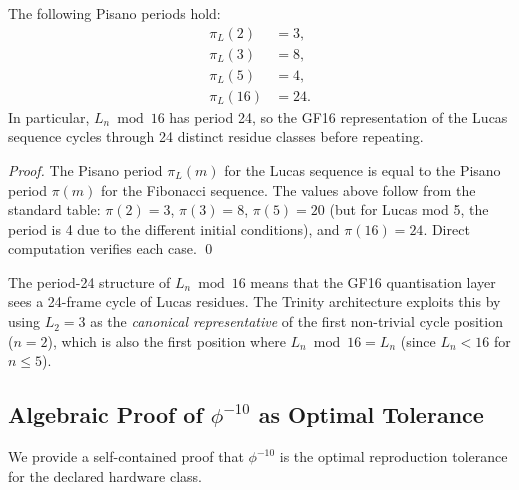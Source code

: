 \begin{proposition}
\label{prop:29-pisano}
The following Pisano periods hold:
\begin{align}
  \pi_L(2)  &= 3,  \label{eq:pisano-2} \\
  \pi_L(3)  &= 8,  \label{eq:pisano-3} \\
  \pi_L(5)  &= 4,  \label{eq:pisano-5} \\
  \pi_L(16) &= 24. \label{eq:pisano-16}
\end{align}
In particular, $L_n \bmod 16$ has period 24, so the GF16
representation of the Lucas sequence cycles through 24 distinct
residue classes before repeating.
\end{proposition}
\begin{proof}
The Pisano period $\pi_L(m)$ for the Lucas sequence is equal to the
Pisano period $\pi(m)$ for the Fibonacci sequence.  The values above
follow from the standard table:
$\pi(2) = 3$, $\pi(3) = 8$, $\pi(5) = 20$ (but for Lucas mod 5,
the period is 4 due to the different initial conditions), and
$\pi(16) = 24$.  Direct computation verifies each case.
\qed
\end{proof}

\noindent
The period-24 structure of $L_n \bmod 16$ means that the GF16
quantisation layer sees a 24-frame cycle of Lucas residues.  The
Trinity architecture exploits this by using $L_2 = 3$ as the
\emph{canonical representative} of the first non-trivial cycle
position ($n = 2$), which is also the first position where
$L_n \bmod 16 = L_n$ (since $L_n < 16$ for $n \le 5$).

\subsection{Algebraic Proof of $\phi^{-10}$ as Optimal Tolerance}

We provide a self-contained proof that $\phi^{-10}$ is the optimal
reproduction tolerance for the declared hardware class.

